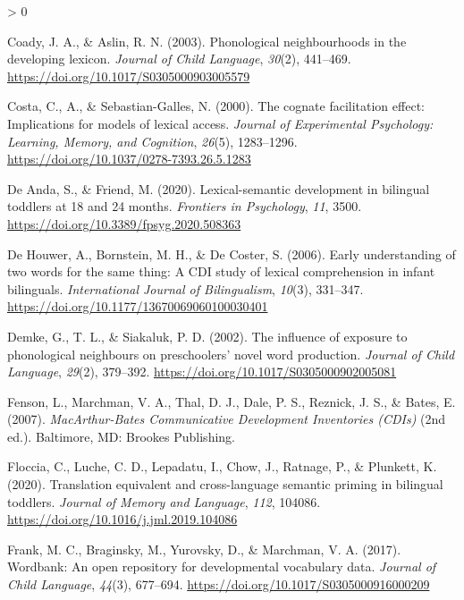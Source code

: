 \documentclass[
  english,
  ,man,floatsintext]{apa6}
\newlength{\cslhangindent}
\newenvironment{CSLReferences}[2] %
 {%
  \setlength{\parindent}{0pt}
  \ifodd #1 \everypar{\setlength{\hangindent}{\cslhangindent}}\ignorespaces\fi
  \ifnum #2 > 0
  \setlength{\parskip}{#2\baselineskip}
  \fi
 }%
 {}
\begin{document}
\begin{CSLReferences}{1}{0}
\leavevmode\hypertarget{ref-Cody_Aslin_2003}{}%
Coady, J. A., \& Aslin, R. N. (2003). Phonological neighbourhoods in the developing lexicon. \emph{Journal of Child Language}, \emph{30}(2), 441--469. \url{https://doi.org/10.1017/S0305000903005579}

\leavevmode\hypertarget{ref-Costa_etal_2000}{}%
Costa, C., A., \& Sebastian-Galles, N. (2000). The cognate facilitation effect: Implications for models of lexical access. \emph{Journal of Experimental Psychology: Learning, Memory, and Cognition}, \emph{26}(5), 1283--1296. \url{https://doi.org/10.1037/0278-7393.26.5.1283}

\leavevmode\hypertarget{ref-DeAnda_Friend_2020}{}%
De Anda, S., \& Friend, M. (2020). Lexical-semantic development in bilingual toddlers at 18 and 24 months. \emph{Frontiers in Psychology}, \emph{11}, 3500. \url{https://doi.org/10.3389/fpsyg.2020.508363}

\leavevmode\hypertarget{ref-DeHouwer_etal_2006}{}%
De Houwer, A., Bornstein, M. H., \& De Coster, S. (2006). Early understanding of two words for the same thing: A {CDI} study of lexical comprehension in infant bilinguals. \emph{International Journal of Bilingualism}, \emph{10}(3), 331--347. \url{https://doi.org/10.1177/13670069060100030401}

\leavevmode\hypertarget{ref-Demke_etal_2002}{}%
Demke, G., T. L., \& Siakaluk, P. D. (2002). The influence of exposure to phonological neighbours on preschoolers' novel word production. \emph{Journal of Child Language}, \emph{29}(2), 379--392. \url{https://doi.org/10.1017/S0305000902005081}

\leavevmode\hypertarget{ref-Fenson_etal_2007}{}%
Fenson, L., Marchman, V. A., Thal, D. J., Dale, P. S., Reznick, J. S., \& Bates, E. (2007). \emph{MacArthur-{B}ates {C}ommunicative {D}evelopment {I}nventories (CDIs)} (2nd ed.). Baltimore, MD: Brookes Publishing.

\leavevmode\hypertarget{ref-Floccia_etal_2020}{}%
Floccia, C., Luche, C. D., Lepadatu, I., Chow, J., Ratnage, P., \& Plunkett, K. (2020). Translation equivalent and cross-language semantic priming in bilingual toddlers. \emph{Journal of Memory and Language}, \emph{112}, 104086. \url{https://doi.org/10.1016/j.jml.2019.104086}

\leavevmode\hypertarget{ref-Frank_etal_2017}{}%
Frank, M. C., Braginsky, M., Yurovsky, D., \& Marchman, V. A. (2017). Wordbank: An open repository for developmental vocabulary data. \emph{Journal of Child Language}, \emph{44}(3), 677--694. \url{https://doi.org/10.1017/S0305000916000209}


\end{CSLReferences}
\end{document}
